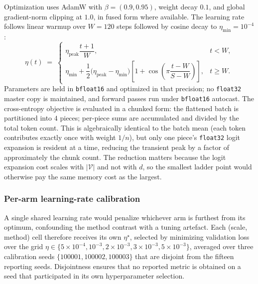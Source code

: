 \documentclass[final,5p,times,twocolumn]{elsarticle}
\theoremstyle{remark}
\begin{document}
Optimization uses AdamW \cite{loshchilov2019} with $\beta = (0.9, 0.95)$,
weight decay $0.1$, and
global gradient-norm clipping at $1.0$, in fused form where available. The
learning rate follows linear warmup over $W = 120$ steps followed by cosine
decay to $\eta_{\min} = 10^{-4}$:
\begin{equation}
\label{eq:lrsched}
\eta(t) \;=\;
\begin{cases}
\eta_{\mathrm{peak}}\dfrac{t+1}{W}, & t < W,\\[2.2ex]
\eta_{\min} + \dfrac{1}{2}\big(\eta_{\mathrm{peak}}-\eta_{\min}\big)
\left[1 + \cos\!\left(\pi\dfrac{t-W}{S-W}\right)\right], & t \geq W.
\end{cases}
\end{equation}
Parameters are held in \texttt{bfloat16} and optimized in that precision; no
\texttt{float32} master copy is maintained, and forward passes run under
\texttt{bfloat16} autocast. The cross-entropy objective is evaluated in a chunked form: the
flattened batch is partitioned into $4$ pieces; per-piece sums are accumulated
and divided by the total token count. This is algebraically identical to the
batch mean (each token contributes exactly once with weight $1/n$), but only
one piece's \texttt{float32} logit expansion is resident at a time, reducing
the transient peak by a factor of approximately the chunk count. The reduction matters because
the logit expansion cost scales with $|\mathcal{V}|$ and not with $d$, so the
smallest ladder point would otherwise pay the same memory cost as the largest.

\subsubsection{Per-arm learning-rate calibration}
\label{sec:lrcal}

A single shared learning rate would penalize whichever arm is furthest from its
optimum, confounding the method contrast with a tuning artefact. Each
(scale, method) cell therefore receives its own $\eta^{\star}$, selected by
minimizing validation loss over the grid
$\eta \in \{5\times 10^{-4}, 10^{-3}, 2\times 10^{-3}, 3\times 10^{-3},
5\times 10^{-3}\}$, averaged over three calibration seeds
$\{100001,100002,100003\}$ that are disjoint from the fifteen reporting seeds.
Disjointness ensures that no reported metric is obtained on a seed that
participated in its own hyperparameter selection.
\end{document}
